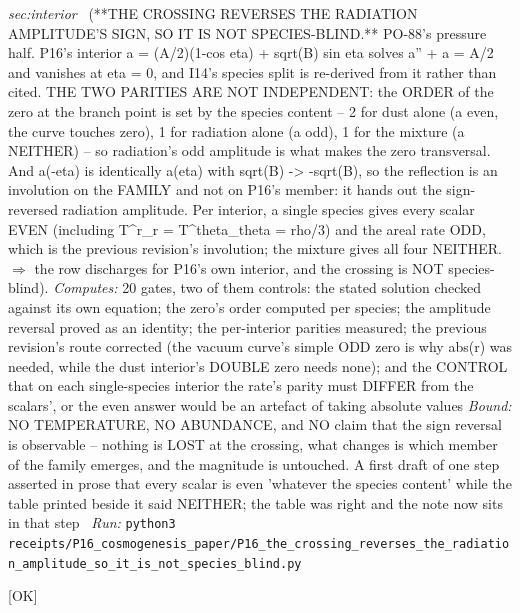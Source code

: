 \begin{description}
\textit{sec:interior} \ (**THE CROSSING REVERSES THE RADIATION AMPLITUDE'S SIGN, SO IT IS NOT SPECIES-BLIND.** PO-88's pressure half. P16's interior a = (A/2)(1-cos eta) + sqrt(B) sin eta solves a'' + a = A/2 and vanishes at eta = 0, and I14's species split is re-derived from it rather than cited. THE TWO PARITIES ARE NOT INDEPENDENT: the ORDER of the zero at the branch point is set by the species content -- 2 for dust alone (a even, the curve touches zero), 1 for radiation alone (a odd), 1 for the mixture (a NEITHER) -- so radiation's odd amplitude is what makes the zero transversal. And a(-eta) is identically a(eta) with sqrt(B) -> -sqrt(B), so the reflection is an involution on the FAMILY and not on P16's member: it hands out the sign-reversed radiation amplitude. Per interior, a single species gives every scalar EVEN (including T\textasciicircum{}r\_r = T\textasciicircum{}theta\_theta = rho/3) and the areal rate ODD, which is the previous revision's involution; the mixture gives all four NEITHER. \ensuremath{\Rightarrow} the row discharges for P16's own interior, and the crossing is NOT species-blind). 
\emph{Computes:} 20 gates, two of them controls: the stated solution checked against its own equation; the zero's order computed per species; the amplitude reversal proved as an identity; the per-interior parities measured; the previous revision's route corrected (the vacuum curve's simple ODD zero is why abs(r) was needed, while the dust interior's DOUBLE zero needs none); and the CONTROL that on each single-species interior the rate's parity must DIFFER from the scalars', or the even answer would be an artefact of taking absolute values
 \emph{Bound:}  NO TEMPERATURE, NO ABUNDANCE, and NO claim that the sign reversal is observable -- nothing is LOST at the crossing, what changes is which member of the family emerges, and the magnitude is untouched.  A first draft of one step asserted in prose that every scalar is even 'whatever the species content' while the table printed beside it said NEITHER; the table was right and the note now sits in that step
\ \emph{Run:} \texttt{python3 receipts/P16\_cosmogenesis\_paper/P16\_the\_crossing\_reverses\_the\_radiation\_amplitude\_so\_it\_is\_not\_species\_blind.py}
\item[\rcptlabel{P16_no_observable_reads_the_sign_of_the_radiation_amplitude}{P16R7}\textbf{P16R7}\quad\texttt{P16\_no\_observable\_reads\_the\_sign\_of\_the\_radiation\_amplitude}]\hfill\textsf{[OK]}\\

\end{description}
